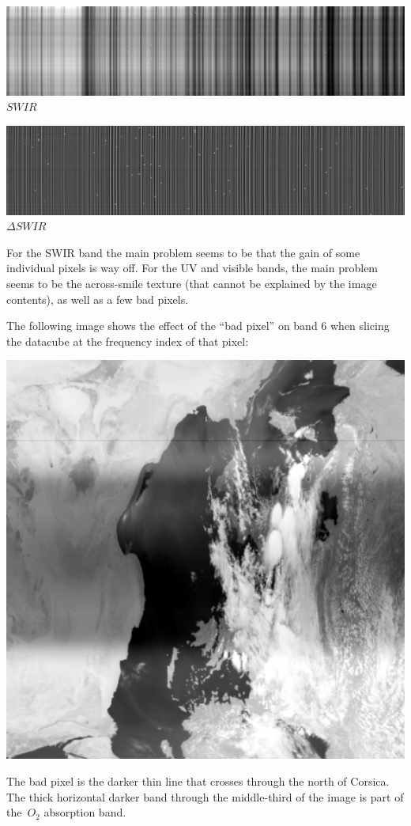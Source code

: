 \documentclass[a4paper]{article}    %
\theoremstyle{note}
\theoremstyle{plain}
\begin{document}
\includegraphics[width=\linewidth]{f/b78_avgs.png}%
$SWIR$

\includegraphics[width=\linewidth]{f/b78_lapavgs.png}%
$\Delta SWIR$

For the SWIR band the main problem seems to be that the gain of some individual
pixels is way off.  For the UV and visible bands, the main problem seems to
be the across-smile texture (that cannot be explained by the image contents),
as well as a few bad pixels.

The following image shows the effect of the ``bad pixel'' on band 6 when
slicing the datacube at the frequency index of that pixel:

\includegraphics[width=0.8\linewidth]{f/r6_288_log.png}

The bad pixel is the darker thin line that crosses through the north of
Corsica.  The thick horizontal darker band through the middle-third of the
image is part of the~$O_2$ absorption band.
\end{document}
